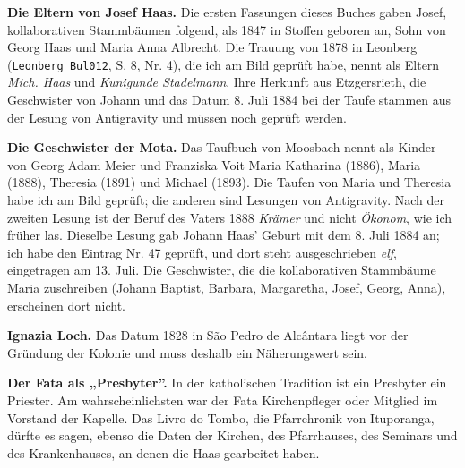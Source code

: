 \documentclass[
  ngerman,
  11pt,
  openany]{book}
\begin{document}
\textbf{Die Eltern von Josef Haas.} Die ersten Fassungen dieses Buches
gaben Josef, kollaborativen Stammbäumen folgend, als 1847 in Stoffen
geboren an, Sohn von Georg Haas und Maria Anna Albrecht. Die Trauung von
1878 in Leonberg (\texttt{Leonberg\_Bul012}, S. 8, Nr. 4), die ich am
Bild geprüft habe, nennt als Eltern \emph{Mich. Haas} und
\emph{Kunigunde Stadelmann}. Ihre Herkunft aus Etzgersrieth, die
Geschwister von Johann und das Datum 8. Juli 1884 bei der Taufe stammen
aus der Lesung von Antigravity und müssen noch geprüft werden.

\textbf{Die Geschwister der Mota.} Das Taufbuch von Moosbach nennt als
Kinder von Georg Adam Meier und Franziska Voit Maria Katharina (1886),
Maria (1888), Theresia (1891) und Michael (1893). Die Taufen von Maria
und Theresia habe ich am Bild geprüft; die anderen sind Lesungen von
Antigravity. Nach der zweiten Lesung ist der Beruf des Vaters 1888
\emph{Krämer} und nicht \emph{Ökonom}, wie ich früher las. Dieselbe
Lesung gab Johann Haas' Geburt mit dem 8. Juli 1884 an; ich habe den
Eintrag Nr. 47 geprüft, und dort steht ausgeschrieben \emph{elf},
eingetragen am 13. Juli. Die Geschwister, die die kollaborativen
Stammbäume Maria zuschreiben (Johann Baptist, Barbara, Margaretha,
Josef, Georg, Anna), erscheinen dort nicht.

\textbf{Ignazia Loch.} Das Datum 1828 in São Pedro de Alcântara liegt
vor der Gründung der Kolonie und muss deshalb ein Näherungswert sein.

\textbf{Der Fata als „Presbyter''.} In der katholischen Tradition ist
ein Presbyter ein Priester. Am wahrscheinlichsten war der Fata
Kirchenpfleger oder Mitglied im Vorstand der Kapelle. Das Livro do
Tombo, die Pfarrchronik von Ituporanga, dürfte es sagen, ebenso die
Daten der Kirchen, des Pfarrhauses, des Seminars und des Krankenhauses,
an denen die Haas gearbeitet haben.
\end{document}
